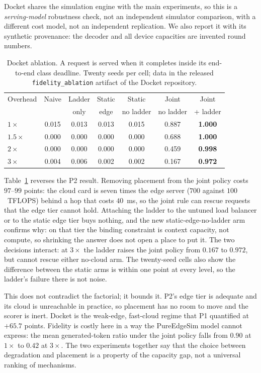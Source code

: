 \documentclass[journal,10pt]{IEEEtran}
\begin{document}
Docket shares the simulation engine with the main experiments, so this is a \emph{serving-model} robustness check, not an independent simulator comparison, with a
different cost model, not an independent replication. We also report it with
its synthetic provenance: the decoder and all device capacities are invented
round numbers.

\begin{table}[t]
\centering
\footnotesize
\caption{Docket ablation. A request is served when it completes inside its
end-to-end class deadline. Twenty seeds per cell; data in the released
\texttt{fidelity\_ablation} artifact of the Docket repository.}
\label{tab:p2-docket}
\setlength{\tabcolsep}{3.5pt}
\begin{tabular}{@{}lcccccc@{}}
\toprule
Overhead & Naive & Ladder & Static & Static & Joint & Joint\\
 & & only & edge & no ladder & no ladder & + ladder\\
\midrule
$1\times$ & 0.015 & 0.013 & 0.013 & 0.015 & 0.887 & \textbf{1.000}\\
$1.5\times$ & 0.000 & 0.000 & 0.000 & 0.000 & 0.688 & \textbf{1.000}\\
$2\times$ & 0.000 & 0.000 & 0.000 & 0.000 & 0.459 & \textbf{0.998}\\
$3\times$ & 0.004 & 0.006 & 0.002 & 0.002 & 0.167 & \textbf{0.972}\\
\bottomrule
\end{tabular}
\end{table}

Table~\ref{tab:p2-docket} reverses the P2 result. Removing placement from the
joint policy costs $97$--$99$ points: the cloud card is seven times the edge
server ($700$ against $100$~TFLOPS) behind a hop that costs $40$~ms, so the joint
rule can rescue requests that the edge tier cannot hold. Attaching the ladder to
the untuned load balancer or to the static edge tier buys nothing, and the new
static-edge-no-ladder arm confirms why: on that tier the binding constraint is
context capacity, not compute, so shrinking the answer does not open a place to
put it. The two decisions interact: at $3\times$ the ladder raises the joint
policy from $0.167$ to $0.972$, but cannot rescue either no-cloud arm. The
twenty-seed cells also show the difference between the static arms is within one
point at every level, so the ladder's failure there is not noise.

This does not contradict the factorial; it bounds it. P2's edge tier is
adequate and its cloud is unreachable in practice, so placement has no room to
move and the scorer is inert. Docket is the weak-edge, fast-cloud regime that
P1 quantified at $+65.7$ points. Fidelity is costly here in a way the PureEdgeSim
model cannot express: the mean generated-token ratio under the joint policy falls
from $0.90$ at $1\times$ to $0.42$ at $3\times$. The two experiments together say
that the choice between degradation and placement is a property of the capacity
gap, not a universal ranking of mechanisms.
\end{document}
